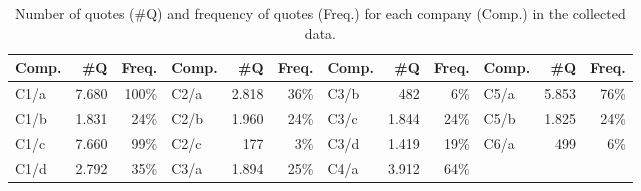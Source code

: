 \begin{table}[ht]
\footnotesize
\centering
\caption{Number of quotes (\#Q) and frequency of quotes (Freq.) for each company (Comp.) in the collected data.}
\label{tab:companies}
\begin{tabular}{||l|r|r||l|r|r||l|r|r||l|r|r||}
\hline
\textbf{Comp.} & \textbf{\#Q} & \textbf{Freq.} & \textbf{Comp.} & \textbf{\#Q} & \textbf{Freq.} & \textbf{Comp.} & \textbf{\#Q} & \textbf{Freq.} & \textbf{Comp.} & \textbf{\#Q} & \textbf{Freq.} \\ \hline

C1/a & 7.680 & 100\% & C2/a & 2.818 & 36\%  & C3/b &  482   &  6\% & C5/a & 5.853  & 76\%  \\ \hline
C1/b & 1.831 & 24\%  & C2/b & 1.960 & 24\%  & C3/c & 1.844 & 24\%  & C5/b & 1.825  & 24\% \\ \hline
C1/c & 7.660 & 99\%  & C2/c & 177   &  3\%  & C3/d & 1.419  & 19\% &  C6/a & 499   &  6\% \\ \hline
C1/d & 2.792 & 35\%  & C3/a & 1.894 & 25\%  & C4/a & 3.912  & 64\% & & &  \\ \hline

\end{tabular}
\end{table}
%




